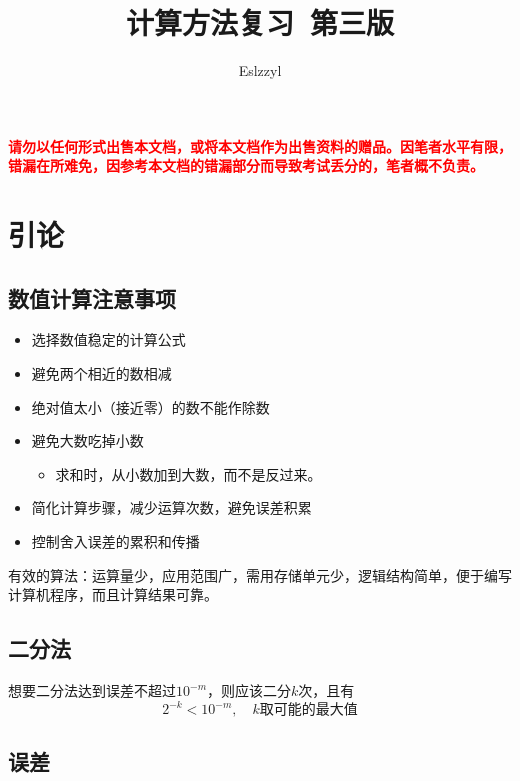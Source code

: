 \documentclass[fontset=ubuntu]{ctexart}
\title{计算方法复习\ 第三版}
\author{Eslzzyl}
\affil{eslzzyl@163.com}
\numberwithin{equation}{section}
\numberwithin{theorem}{section}
\begin{document}
    \maketitle
    \newpage
    \tableofcontents
    \vspace{20pt}
    \textcolor{red}{\textbf{请勿以任何形式出售本文档，或将本文档作为出售资料的赠品。因笔者水平有限，错漏在所难免，因参考本文档的错漏部分而导致考试丢分的，笔者概不负责。}}
    \newpage

\section{引论}
\begin{multicols}{2}

    \subsection{数值计算注意事项}
    \begin{itemize}
        \item 选择数值稳定的计算公式
        \item 避免两个相近的数相减
        \item 绝对值太小（接近零）的数不能作除数
        \item 避免大数吃掉小数
        \begin{itemize}
            \item 求和时，从小数加到大数，而不是反过来。
        \end{itemize}
        \item 简化计算步骤，减少运算次数，避免误差积累
        \item 控制舍入误差的累积和传播
    \end{itemize}

    有效的算法：运算量少，应用范围广，需用存储单元少，逻辑结构简单，便于编写计算机程序，而且计算结果可靠。
    
    \subsection{二分法}

    想要二分法达到误差不超过$10^{-m}$，则应该二分$k$次，且有
    \begin{equation*}
        2^{-k}<10^{-m},\quad k\text{取可能的最大值}
    \end{equation*}
    
    \subsection{误差}

\end{multicols}
\end{document}
